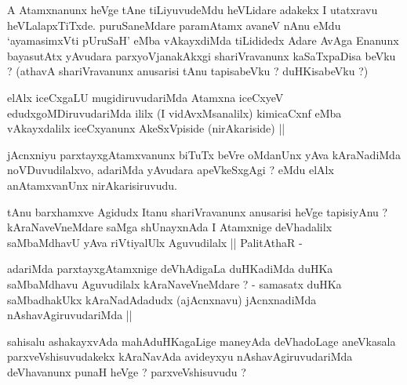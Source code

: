 
\begin{artha}
A Atamxnanunx heVge tAne tiLiyuvudeMdu heVLidare adakekx I utatxravu
heVLalapxTiTxde. puruSaneMdare paramAtamx avaneV nAnu eMdu
`ayamasimxVti pUruSaH' eMba vAkayxdiMda tiLididedx Adare AvAga Enanunx
bayasutAtx yAvudara parxyoVjanakAkxgi shariVravanunx kaSaTxpaDisa
beVku ? (athavA shariVravanunx anusarisi tAnu tapisabeVku ?
duHKisabeVku ?)
\end{artha}


\begin{artha}
elAlx iceCxgaLU mugidiruvudariMda Atamxna iceCxyeV
edudxgoMDiruvudariMda ililx (I vidAvxMsanalilx) kimicaCxnf eMba
vAkayxdalilx iceCxyanunx AkeSxVpiside (nirAkariside) ||
\end{artha}


\begin{artha}
jAcnxniyu parxtayxgAtamxvanunx biTuTx beVre oMdanUnx yAva kAraNadiMda
noVDuvudilalxvo, adariMda yAvudara apeVkeSxgAgi ? eMdu elAlx
anAtamxvanUnx nirAkarisiruvudu.
\end{artha}


\begin{artha}
tAnu barxhamxve Agidudx Itanu shariVravanunx anusarisi heVge
tapisiyAnu ? kAraNaveVneMdare saMga shUnayxnAda I Atamxnige
deVhadalilx saMbaMdhavU yAva riVtiyalUlx Aguvudilalx || PalitAthaR -
\end{artha}

\begin{artha}
adariMda parxtayxgAtamxnige deVhAdigaLa duHKadiMda duHKa saMbaMdhavu
Aguvudilalx kAraNaveVneMdare ? - samasatx duHKa saMbadhakUkx
kAraNadAdadudx (ajAcnxnavu) jAcnxnadiMda nAshavAgiruvudariMda ||
\end{artha}


\begin{artha}
sahisalu ashakayxvAda mahAduHKagaLige maneyAda deVhadoLage aneVkasala
parxveVshisuvudakekx kAraNavAda avideyxyu nAshavAgiruvudariMda
deVhavanunx punaH heVge ? parxveVshisuvudu ?
\end{artha}

